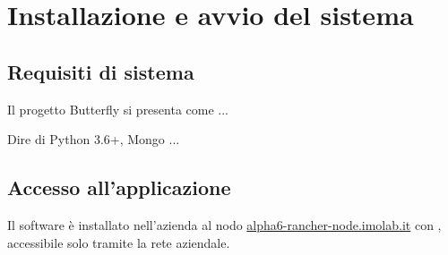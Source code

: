 \section{Installazione e avvio del sistema}\label{installazione}

\subsection{Requisiti di sistema}

Il progetto Butterfly si presenta come ...

Dire di Python 3.6+, Mongo ...


\subsection{Accesso all'applicazione}

Il software è installato nell'azienda al nodo \url{alpha6-rancher-node.imolab.it} con , accessibile solo tramite la rete aziendale.
